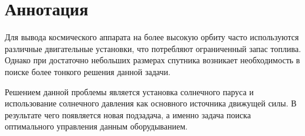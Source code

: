 \chapter{Аннотация}
\noindent\indent Для вывода космического аппарата на более высокую орбиту
часто используются различные двигательные установки, что потребляют ограниченный
запас топлива. Однако при достаточно небольших размерах спутника возникает необходимость
в поиске более тонкого решения данной задачи.\par
Решением данной проблемы является установка солнечного паруса и использование
солнечного давления как основного источника движущей силы. В результате чего
появляется новая подзадача, а именно задача поиска оптимального управления данным
оборудыванием.
